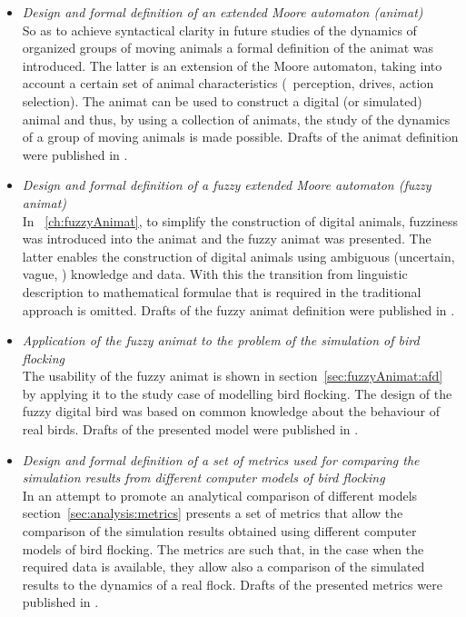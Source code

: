 \begin{itemize}
%
\item \emph{Design and formal definition of an extended Moore automaton (animat)}\\
So as to achieve syntactical clarity in future studies of the dynamics of organized groups of moving animals a formal definition of the animat was introduced. The latter is an extension of the Moore automaton, taking into account a certain set of animal characteristics (\ie\ perception, drives, action selection). The animat can be used to construct a digital (or simulated) animal and thus, by using a collection of animats, the study of the dynamics of a group of moving animals is made possible. Drafts of the animat definition were published in \cite{lebar_bajec:2002,lebar_bajec:2003a,lebar_bajec:2003b,mraz:2004}.
%
\item \emph{Design and formal definition of a fuzzy extended Moore automaton (fuzzy animat)}\\
In \chaptername~\ref{ch:fuzzyAnimat}, to simplify the construction of digital animals, fuzziness was introduced into the animat and the fuzzy animat was presented. The latter enables the construction of digital animals using ambiguous (uncertain, vague, \etc) knowledge and data. With this the transition from linguistic description to mathematical formulae that is required in the traditional approach is omitted. Drafts of the fuzzy animat definition were published in \cite{lebar_bajec:2003a,lebar_bajec:2003b,mraz:2004}.
%
\item \emph{Application of the fuzzy animat to the problem of the simulation of bird flocking}\\
The usability of the fuzzy animat is shown in section~\ref{sec:fuzzyAnimat:afd} by applying it to the study case of modelling bird flocking. The design of the fuzzy digital bird was based on common knowledge about the behaviour of real birds. Drafts of the presented model were published in \cite{lebar_bajec:2003a,lebar_bajec:2003b,lebar_bajec:2005a}.
%
\item \emph{Design and formal definition of a set of metrics used for comparing the simulation results from different computer models of bird flocking}\\
In an attempt to promote an analytical comparison of different models section~\ref{sec:analysis:metrics} presents a set of metrics that allow the comparison of the simulation results obtained using different computer models of bird flocking. The metrics are such that, in the case when the required data is available, they allow also a comparison of the simulated results to the dynamics of a real flock. Drafts of the presented metrics were published in \cite{lebar_bajec:2002,lebar_bajec:2003a,lebar_bajec:2003b,lebar_bajec:2005a}.

\end{itemize}
